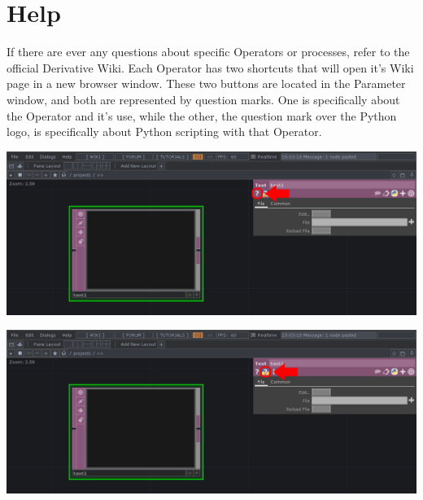 
\section{Help}

\begin{fullwidth}

If there are ever any questions about specific Operators or processes, refer to the official Derivative Wiki. Each Operator has two shortcuts that will open it's Wiki page in a new browser window. These two buttons are located in the Parameter window, and both are represented by question marks. One is specifically about the Operator and it's use, while the other, the question mark over the Python logo, is specifically about Python scripting with that Operator.

\begin{center}
\includegraphics[width=15cm]{./img/1.6/help-1.png}

\includegraphics[width=15cm]{./img/1.6/help-2.png}
\end{center}

\end{fullwidth}


